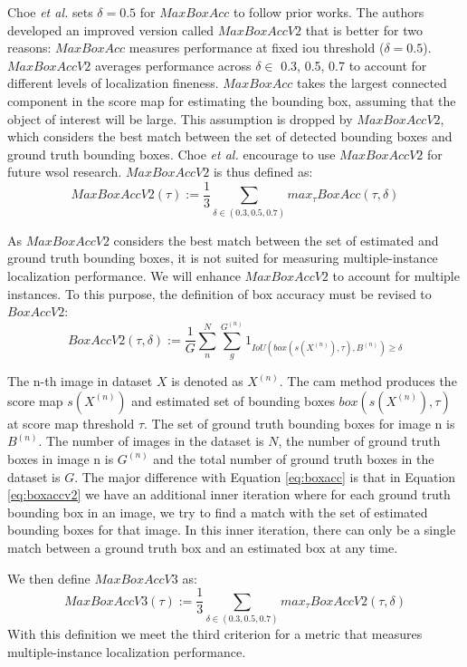 Choe \textit{et al.} \cite{choe2020evaluating} sets $\delta = 0.5$ for $MaxBoxAcc$ to follow prior works. The authors developed an improved version called $MaxBoxAccV2$ that is better for two reasons: $MaxBoxAcc$ measures performance at fixed \acrshort{iou} threshold ($\delta = 0.5$). $MaxBoxAccV2$ averages performance across $\delta \in$ {0.3, 0.5, 0.7} to account for different levels of localization fineness. $MaxBoxAcc$ takes the largest connected component in the score map for estimating the bounding box, assuming that the object of interest will be large. This assumption is dropped by $MaxBoxAccV2$, which considers the best match between the set of detected bounding boxes and ground truth bounding boxes. Choe \textit{et al.} encourage to use $MaxBoxAccV2$ for future \acrshort{wsol} research. $MaxBoxAccV2$ is thus defined as:
\begin{equation}
    MaxBoxAccV2(\tau) := \frac{1}{3} \sum_{\delta \in (0.3,0.5,0.7)} max_{\tau} BoxAcc(\tau,\delta)
\end{equation}

As $MaxBoxAccV2$ considers the best match between the set of estimated and ground truth bounding boxes, it is not suited for measuring multiple-instance localization performance. We will enhance $MaxBoxAccV2$ to account for multiple instances. To this purpose, the definition of box accuracy must be revised to $BoxAccV2$:
\begin{equation} \label{eq:boxaccv2}
    BoxAccV2(\tau,\delta) := \frac{1}{G} \sum^{N}_{n} \sum^{G^{(n)}}_{g}  1_{IoU(box(s(X^{(n)}),\tau),B^{(n)})\ge\delta}
\end{equation}

The n-th image in dataset $X$ is denoted as $X^{(n)}$. The \acrshort{cam} method produces the score map $s(X^{(n)})$ and estimated set of bounding boxes $box(s(X^{(n)}),\tau)$ at score map threshold $\tau$. The set of ground truth bounding boxes for image n is $B^{(n)}$. The number of images in the dataset is $N$, the number of ground truth boxes in image n is $G^{(n)}$ and the total number of ground truth boxes in the dataset is $G$. The major difference with Equation \ref{eq:boxacc} is that in Equation \ref{eq:boxaccv2} we have an additional inner iteration where for each ground truth bounding box in an image, we try to find a match with the set of estimated bounding boxes for that image. In this inner iteration, there can only be a single match between a ground truth box and an estimated box at any time.

We then define $MaxBoxAccV3$ as:
\begin{equation}
    MaxBoxAccV3(\tau) := \frac{1}{3} \sum_{\delta \in (0.3,0.5,0.7)} max_{\tau} BoxAccV2(\tau,\delta)
\end{equation}
With this definition we meet the third criterion for a metric that measures multiple-instance localization performance.

